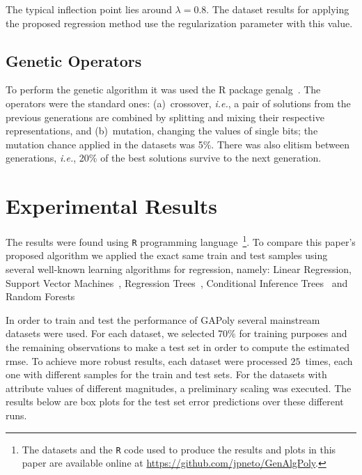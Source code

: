 \documentclass[final,authoryear,3p,times,twocolumn]{elsarticle}
\begin{document}
The typical inflection point lies around $\lambda = 0.8$. The dataset results for applying the proposed regression method use the regularization parameter with this value.

\subsection{Genetic Operators}

To perform the genetic algorithm it was used the R package genalg~\citep{willighage2012genalg}. The operators were the standard ones: (a)~crossover, \emph{i.e.}, a pair of solutions from the previous generations are combined by splitting and mixing their respective representations, and (b)~mutation, changing the values of single bits; the mutation chance applied in the datasets was 5\%. There was also elitism between generations, \emph{i.e.}, 20\% of the best solutions survive to the next generation.

\section{Experimental Results}

The results were found using \texttt{R} programming language~\citep{R}\footnote{The datasets and the \texttt{R} code used to produce the results and plots in this paper are available online at \url{https://github.com/jpneto/GenAlgPoly}.}. To compare this paper's proposed algorithm we applied the exact same train and test samples using several well-known learning algorithms for regression, namely: Linear Regression, Support Vector Machines~\citep{Meyer12}, Regression Trees~\citep{Therneau13}, Conditional Inference Trees~\citep{Hothorn06, Strobl07, Strobl08} and Random Forests~\citep{Liaw02}

In order to train and test the performance of \ac{GAPoly} several mainstream datasets were used. For each dataset, we selected 70\% for training purposes and the remaining observations to make a test set in order to compute the estimated \ac{rmse}. To achieve more robust results, each dataset were processed $25$~times, each one with different samples for the train and test sets. For the datasets with attribute values of different magnitudes, a preliminary scaling was executed. The results below are box plots for the test set error predictions over these different runs.
\end{document}

